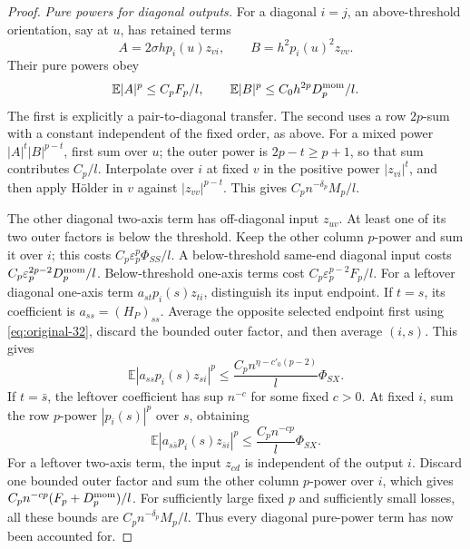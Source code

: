 \begin{proof}
\par\smallskip\noindent\textit{Pure powers for diagonal outputs.}\quad
For a diagonal \(i=j\), an above-threshold orientation, say at
\(u\), has retained terms
\[
 A=2\sigma h p_i(u)z_{vi},\qquad
 B=h^2p_i(u)^2z_{vv}.
\]
Their pure powers obey
\[
 \mathbb E|A|^p\le C_pF_p/l,
 \qquad \mathbb E|B|^p\le C_0h^{2p}D_p^{\rm mom}/l.
\]
The first is explicitly a pair-to-diagonal transfer. The second
uses a row \(2p\)-sum with a constant independent of the fixed
order, as above. For a mixed power \(|A|^t|B|^{p-t}\), first
sum over \(u\); the outer power is \(2p-t\ge p+1\), so that
sum contributes \(C_p/l\). Interpolate over \(i\) at fixed
\(v\) in the positive power \(|z_{vi}|^t\), and then apply
H\"older in \(v\) against \(|z_{vv}|^{p-t}\). This gives
\(C_p n^{-\delta_p}M_p/l\).

The other diagonal two-axis term has off-diagonal input \(z_{uv}\).
At least one of its two outer factors is below the threshold.
Keep the other column \(p\)-power and sum it over \(i\); this
costs \(C_p\varepsilon_p^p\Phi_{SS}/l\).
A below-threshold same-end diagonal input costs
\(C_p\varepsilon_p^{2p-2}D_p^{\rm mom}/l\).
Below-threshold one-axis terms cost
\(C_p\varepsilon_p^{p-2}F_p/l\).
For a leftover diagonal one-axis term
\(a_{st}p_i(s)z_{ti}\), distinguish its input endpoint. If
\(t=s\), its coefficient is \(a_{ss}=(H_P)_{ss}\).
Average the opposite selected endpoint first using
\eqref{eq:original-32}, discard the bounded outer factor, and
then average \((i,s)\). This gives
\[
 \mathbb E|a_{ss}p_i(s)z_{si}|^p
 \le\frac{C_p n^{\eta-c'_0(p-2)}}l\Phi_{SX}.
\]
If \(t=\bar s\), the leftover coefficient has sup
\(n^{-c}\) for some fixed \(c>0\). At fixed \(i\), sum the
row \(p\)-power \(|p_i(s)|^p\) over \(s\), obtaining
\[
 \mathbb E|a_{s\bar s}p_i(s)z_{\bar s i}|^p
 \le\frac{C_p n^{-cp}}l\Phi_{SX}.
\]
For a leftover two-axis term, the input \(z_{cd}\) is independent
of the output \(i\). Discard one bounded outer factor and sum
the other column \(p\)-power over \(i\), which gives
\(C_p n^{-cp}(F_p+D_p^{\rm mom})/l\).
For sufficiently large fixed \(p\) and sufficiently small losses,
all these bounds are \(C_p n^{-\delta_p}M_p/l\).
Thus every diagonal pure-power term has now been accounted for.


\end{proof}
